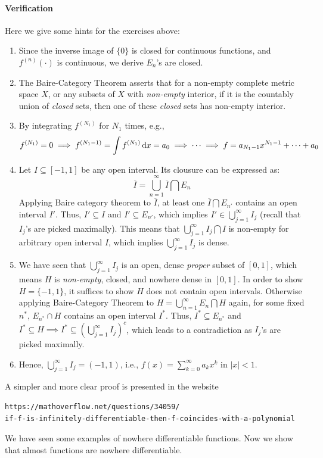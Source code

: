 \paragraph{Verification}
Here we give some hints for the exercises above:
\begin{enumerate}
\item
Since the inverse image of $\{0\}$ is closed for continuous functions, and $f^{(n)}(\cdot)$ is continuous, we derive $E_n$'s are closed.
\item
The Baire-Category Theorem asserts that for a non-empty complete metric space $X$, or any subsets of $X$ with \emph{non-empty} interior, if it is the countably union of \emph{closed} sets, then one of these \emph{closed} sets has non-empty interior.
\item
By integrating $f^{(N_1)}$ for $N_1$ times, e.g.,
\[
f^{(N_1)}=0\implies
f^{(N_1-1)} = \int f^{(N_1)}\,\mathrm{d} x=a_0\implies
\cdots\implies
f=a_{N_1-1}x^{N_1-1}+\cdots+a_0
\]
\item
Let $I\subseteq[-1,1]$ be any open interval. Its clousure can be expressed as:
\[
\overline{I} = \bigcup_{n=1}^\infty \overline{I}\bigcap E_n
\]
Applying Baire category theorem to $\overline{I}$, at least one $\overline{I}\bigcap E_{n'}$ contains an open interval $I'$. Thus, $I'\subseteq I$ and $I'\subseteq E_{n'}$, which implies $I'\in\bigcup_{j=1}^\infty I_j$ (recall that $I_j$'s are picked maximally). This means that $\bigcup_{j=1}^\infty I_j\bigcap I$ is non-empty for arbitrary open interval $I$, which implies $\bigcup_{j=1}^\infty I_j$ is dense.
\item
We have seen that $\bigcup_{j=1}^\infty I_j$ is an open, dense \emph{proper} subset of $[0,1]$, which means $H$ is \emph{non-empty}, closed, and nowhere dense in $[0,1]$. In order to show $H=\{-1,1\}$, it suffices to show $H$ does not contain open intervals. Otherwise applying Baire-Category Theorem to $H=\bigcup_{n=1}^\infty E_n\bigcap H$ again, for some fixed $n^*$, $E_{n^*}\cap H$ contains an open interval $I^*$. Thus, $I^*\subseteq E_{n^*}$ and $I^*\subseteq H\implies I^*\subseteq(\bigcup_{j=1}^\infty I_j)^c$, which leads to a contradiction as $I_j$'s are picked maximally.
\item
Hence, $\bigcup_{j=1}^\infty I_j=(-1,1)$, i.e., $f(x)=\sum_{k=0}^\infty a_kx^k$ in $|x|<1$.
\end{enumerate}
A simpler and more clear proof is presented in the website
\begin{verbatim}
https://mathoverflow.net/questions/34059/
if-f-is-infinitely-differentiable-then-f-coincides-with-a-polynomial
\end{verbatim}
We have seen some examples of nowhere differentiable functions. Now we show that almost functions are nowhere differentiable.

